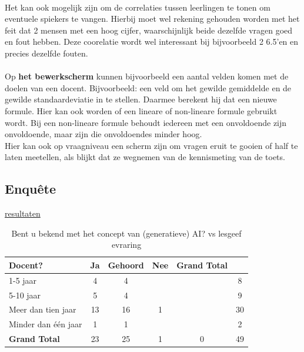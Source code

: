 \documentclass[12pt]{article}
\begin{document}
\begin{multicols}{2}
\\
Het kan ook mogelijk zijn om de correlaties tussen leerlingen te tonen om eventuele spiekers te vangen. Hierbij moet wel rekening gehouden worden met het feit dat 2 mensen met een hoog cijfer, waarschijnlijk beide dezelfde vragen goed en fout hebben. Deze coorelatie wordt wel interessant bij bijvoorbeeld 2 6.5'en en precies dezelfde fouten.\\
\\
Op \textbf{het bewerkscherm} kunnen bijvoorbeeld een aantal velden komen met de doelen van een docent. Bijvoorbeeld: een veld om het gewilde gemiddelde en de gewilde standaardeviatie in te stellen. Daarmee berekent hij dat een nieuwe formule. Hier kan ook worden of een lineare of non-lineare formule gebruikt wordt. Bij een non-lineare formule behoudt iedereen met een onvoldoende zijn onvoldoende, maar zijn die onvoldoendes minder hoog. \\
Hier kan ook op vraagniveau een scherm zijn om vragen eruit te gooien of half te laten meetellen, als blijkt dat ze wegnemen van de kennismeting van de toets.
\end{multicols}

\pagebreak
\subsection{Enquête}
\href{https://docs.google.com/spreadsheets/d/10Z6uwL6eRiDsPIC6HQ5hyizUN8RciJKFSDRZBGiKdDI}{resultaten}

\noindent
\begin{table}[H]
    \caption{Bent u bekend met het concept van (generatieve) AI? vs lesgeef evraring}
    \begin{tabular}{l c c c c c}
        \toprule
        \textbf{Docent?} & \textbf{Ja} & \textbf{Gehoord} & \textbf{Nee} & \textbf{Grand Total} \\
        \midrule
        1-5 jaar      & 4  & 4  &   &   & 8  \\
        5-10 jaar     & 5  & 4  &   &   & 9  \\
        Meer dan tien jaar & 13 & 16 & 1 &   & 30 \\
        Minder dan één jaar & 1  & 1  &   &   & 2  \\
        \midrule
        \textbf{Grand Total} & 23 & 25 & 1 & 0 & 49 \\
        \bottomrule
    \end{tabular}
\end{table}
\end{document}
